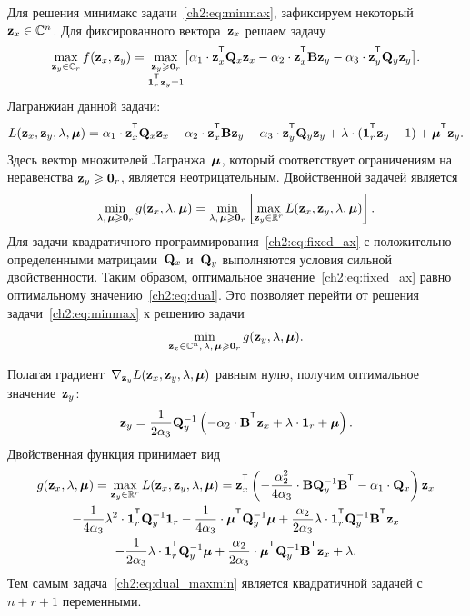 Для решения минимакс задачи~\eqref{ch2:eq:minmax}, зафиксируем некоторый~$\mathbf{z}_x \in \mathbb{C}^n$. Для фиксированного вектора~$\mathbf{z}_x$ решаем задачу
\begin{equation}
\max_{\bz_y \in \mathbb{C}_r} f(\bz_x, \bz_y) = \max_{\substack{\bz_y \geq \bZero_r \\ \bOne_r^{\T}\bz_y=1}} \bigl[\alpha_1 \cdot \bz_x^{\T} \bQ_x \bz_x - \alpha_2 \cdot \bz_x^{\T} \bB \bz_y - \alpha_3 \cdot \bz_y^{\T} \bQ_y \bz_y \bigr].
\label{ch2:eq:fixed_ax}
\end{equation}
Лагранжиан данной задачи:
\begin{equation*}
L(\bz_x, \bz_y, \lambda, \bmu) = \alpha_1 \cdot \bz_x^{\T} \bQ_x \bz_x - \alpha_2 \cdot \bz_x^{\T} \bB \bz_y - \alpha_3 \cdot \bz_y^{\T} \bQ_y \bz_y + \lambda \cdot  (\bOne_r^{\T} \bz_y - 1) + \bmu^{\T} \bz_y.
\end{equation*}
Здесь вектор множителей Лагранжа~$\boldsymbol{\mu}$, который соответствует ограничениям на неравенства $\mathbf{z}_y \geqslant \boldsymbol{0}_r$, является неотрицательным.
Двойственной задачей является
\begin{equation}
\min_{\lambda, \, \boldsymbol{\mu} \geqslant \boldsymbol{0}_r} g(\mathbf{z}_x, \lambda, \boldsymbol{\mu}) = \min_{\lambda, \, \boldsymbol{\mu} \geqslant \boldsymbol{0}_r}  \left[\max_{\mathbf{z}_y \in \mathbb{R}^r} L(\mathbf{z}_x, \mathbf{z}_y, \lambda, \boldsymbol{\mu}) \right].
\label{ch2:eq:dual}
\end{equation}
Для задачи квадратичного программирования~\eqref{ch2:eq:fixed_ax} с положительно определенными матрицами~$\mathbf{Q}_x$ и~$\mathbf{Q}_y$ выполняются условия сильной двойственности. Таким образом, оптимальное значение~\eqref{ch2:eq:fixed_ax} равно оптимальному значению~\eqref{ch2:eq:dual}. Это позволяет перейти от решения задачи~\eqref{ch2:eq:minmax} к решению задачи
\begin{equation}
\min_{\mathbf{z}_x \in \mathbb{C}^n, \, \lambda, \, \boldsymbol{\mu} \geqslant \boldsymbol{0}_r} g(\mathbf{z}_y, \lambda, \boldsymbol{\mu}).
\label{ch2:eq:dual_maxmin}
\end{equation}

Полагая градиент~$\nabla_{\mathbf{z}_y} L(\mathbf{z}_x, \mathbf{z}_y, \lambda, \boldsymbol{\mu})$ равным нулю, получим оптимальное значение~$\mathbf{z}_y$:
\begin{equation}
\bz_y = \frac{1}{2\alpha_3} \bQ_y^{-1} \left( - \alpha_2 \cdot \bB^{\T} \bz_x +\lambda \cdot \bOne_r + \bmu \right).
\label{ch2:eq:ax}
\end{equation}
Двойственная функция принимает вид
\begin{multline}
g(\bz_x, \lambda, \bmu)
= \max_{\bz_y \in \bbR^r} L(\bz_x, \bz_y, \lambda, \bmu) =
\bz_x^{\T} \left( - \frac{\alpha_2^2}{4\alpha_3} \cdot \bB \bQ_y^{-1} \bB^{\T} - \alpha_1 \cdot \bQ_x\right) \bz_x \\ - \frac{1}{4 \alpha_3} \lambda^2 \cdot \bOne_r^{\T} \bQ_y^{-1} \bOne_r - \frac{1}{4 \alpha_3} \cdot \bmu^{\T} \bQ_y^{-1} \bmu + \frac{\alpha_2}{2 \alpha_3} \lambda \cdot \bOne_r^{\T} \bQ_y^{-1} \bB^{\T} \bz_x \\ - \frac{1}{2 \alpha_3} \lambda \cdot \bOne_r^{\T} \bQ_y^{-1} \bmu + \frac{\alpha_2}{2 \alpha_3} \cdot \bmu^{\T} \bQ_y^{-1} \bB^{\T} \bz_x + \lambda.
\label{ch2:eq:dual_quadratic_form}
\end{multline}
Тем самым задача~\eqref{ch2:eq:dual_maxmin} является квадратичной задачей с~$n + r + 1$ переменными.

